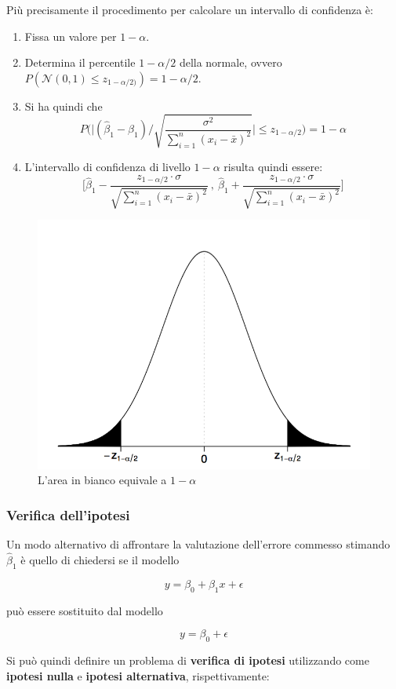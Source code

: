Più precisamente il procedimento per calcolare un intervallo di confidenza è:

\begin{enumerate}
	\item Fissa un valore per $ 1-\alpha $.
	\item Determina il percentile $ 1 - \alpha/2 $ della normale, ovvero $ P(\mathcal{N}(0,1) \leq z_{1 - \alpha/2)}) = 1 - \alpha/2 $.
	\item Si ha quindi che 
	$$
	P\Bigg( \Bigg| (\hat{\beta}_1 - \beta_1) \Bigg/ \sqrt{\frac{\sigma^2}{\sum_{i=1}^n (x_i - \bar{x})^2}}\Bigg| \leq z_{1 - \alpha/2}\Bigg) = 1 - \alpha
	$$
	\item L'intervallo di confidenza di livello $ 1 - \alpha $ risulta quindi essere:
	$$
	\Bigg[ \hat{\beta}_1 - \frac{z_{1-\alpha/2} \cdot \sigma}{\sqrt{\sum_{i=1}^n (x_i - \bar{x})^2}} \: , \: \hat{\beta}_1 + \frac{z_{1-\alpha/2} \cdot \sigma}{\sqrt{\sum_{i=1}^n (x_i - \bar{x})^2}}\Bigg]
	$$
\end{enumerate}

\begin{figure}[htbp]
\centering
\includegraphics[width = .5\textwidth]{./notes/immagini/l5-fig1-1.png}
\caption{L'area in bianco equivale a $ 1 - \alpha $}
\end{figure}

\subsubsection{Verifica dell'ipotesi}

Un modo alternativo di affrontare la valutazione dell'errore commesso stimando $ \hat{\beta}_1 $ è quello di chiedersi se il modello

$$
y = \beta_0 + \beta_1 x + \epsilon
$$

può essere sostituito dal modello

$$
y = \beta_0 + \epsilon
$$

Si può quindi definire un problema di \textbf{verifica di ipotesi} utilizzando come \textbf{ipotesi nulla} e \textbf{ipotesi alternativa}, rispettivamente:


